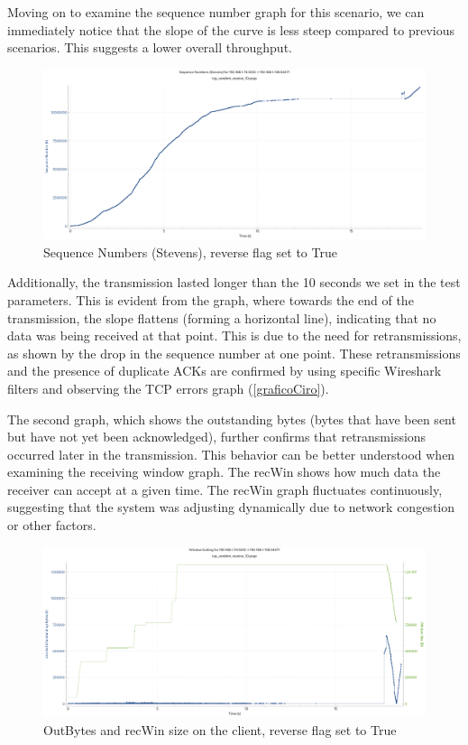 Moving on to examine the sequence number graph for this scenario, we can immediately notice that the slope of the curve is less steep compared to previous scenarios. This suggests a lower overall throughput. 

\begin{figure}[H]
    \centering
    \includegraphics[width=0.75\linewidth]{images/SeqNumSaltWater.pdf}
    \caption{Sequence Numbers (Stevens), reverse flag set to True}
    \label{fig:enter-label}
\end{figure}

Additionally, the transmission lasted longer than the 10 seconds we set in the test parameters. 
This is evident from the graph, where towards the end of the transmission, the slope flattens (forming a horizontal line), indicating that no data was being received at that point. This is due to the need for retransmissions, as shown by the drop in the sequence number at one point. These retransmissions and the presence of duplicate ACKs are confirmed by using specific Wireshark filters and observing the TCP errors graph (\ref{graficoCiro}).

The second graph, which shows the outstanding bytes (bytes that have been sent but have not yet been acknowledged), further confirms that retransmissions occurred later in the transmission. This behavior can be better understood when examining the receiving window graph. The recWin shows how much data the receiver can accept at a given time. The recWin graph fluctuates continuously, suggesting that the system was adjusting dynamically due to network congestion or other factors. 

\begin{figure}[H]
    \centering
    \includegraphics[width=0.75\linewidth]{RecWinSaltWater.pdf}
    \caption{OutBytes and recWin size on the client, reverse flag set to True}
    \label{fig:enter-label}
\end{figure}


